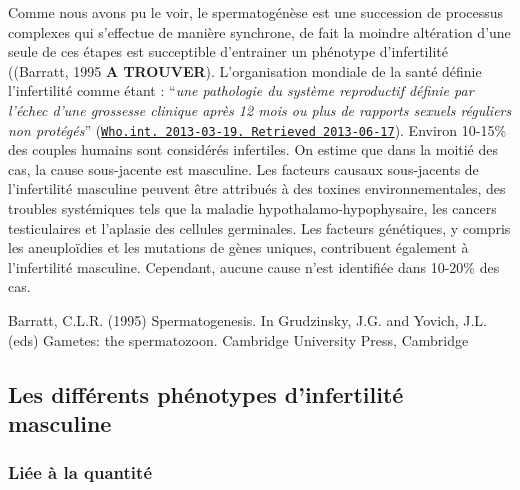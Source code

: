 \documentclass[12pt,twoside]{reedthesis}
\theoremstyle{definition}
\theoremstyle{definition}
\theoremstyle{remark}
\begin{document}
  Comme nous avons pu le voir, le spermatogénèse est une succession de
  processus complexes qui s'effectue de manière synchrone, de fait la
  moindre altération d'une seule de ces étapes est succeptible d'entrainer
  un phénotype d'infertilité ((Barratt, 1995 \textbf{A TROUVER}).
  L'organisation mondiale de la santé définie l'infertilité comme étant :
  ``\emph{une pathologie du système reproductif définie par l'échec d'une
  grossesse clinique après 12 mois ou plus de rapports sexuels réguliers
  non protégés}''
  (\href{http://www.who.int/reproductivehealth/topics/infertility/definitions/en/}{\texttt{Who.int.\ 2013-03-19.\ Retrieved\ 2013-06-17}}).
  Environ 10-15\% des couples humains sont considérés infertiles. On
  estime que dans la moitié des cas, la cause sous-jacente est masculine.
  Les facteurs causaux sous-jacents de l'infertilité masculine peuvent
  être attribués à des toxines environnementales, des troubles systémiques
  tels que la maladie hypothalamo-hypophysaire, les cancers testiculaires
  et l'aplasie des cellules germinales. Les facteurs génétiques, y compris
  les aneuploïdies et les mutations de gènes uniques, contribuent
  également à l'infertilité masculine. Cependant, aucune cause n'est
  identifiée dans 10-20\% des cas.
  
  Barratt, C.L.R. (1995) Spermatogenesis. In Grudzinsky, J.G. and Yovich,
  J.L. (eds) Gametes: the spermatozoon. Cambridge University Press,
  Cambridge
  
  \subsection{Les différents phénotypes d'infertilité
  masculine}\label{les-differents-phenotypes-dinfertilite-masculine}
  
  \subsubsection{Liée à la quantité}\label{liee-a-la-quantite}
  
\end{document}
